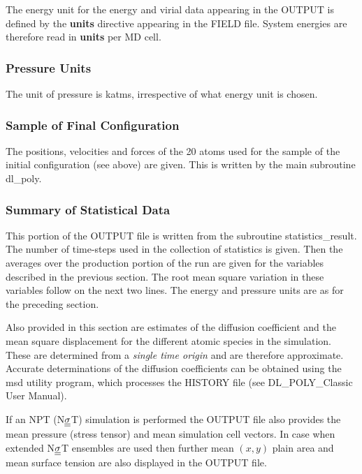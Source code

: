 The energy unit for the energy and virial data appearing in the
OUTPUT is defined by the {\bf units} directive appearing in the
FIELD file.  System energies are therefore read in {\bf units}
per MD cell.

\subsubsection*{Pressure Units}

The unit of pressure is katms, irrespective
of what energy unit is chosen.

\subsubsection{Sample of Final Configuration}

The positions, velocities and forces of the 20 atoms used for the
sample of the initial configuration (see above) are given.  This
is written by the main subroutine {\sc dl\_poly}.

\subsubsection{Summary of Statistical Data}

This portion of the OUTPUT file is written from the subroutine
{\sc statistics\_result}.  The number of time-steps used in the
collection of statistics is given.  Then the averages over the
production portion of the run are given for the variables
described in the previous section.  The root mean square variation
in these variables follow on the next two lines.  The
energy and pressure
units are as for the preceding section.

Also provided in this section are estimates of the diffusion
coefficient and the mean square displacement for the different
atomic species in the simulation.  These are determined from a {\em
single time origin} and are therefore approximate.  Accurate
determinations of the diffusion coefficients can be obtained using
the {\sc msd} utility program, which processes the HISTORY file
(see DL\_POLY\_Classic User Manual).

If an NPT (N$\mbox{$\underline{\underline{\bf \sigma}}$}$T) simulation is performed the OUTPUT
file also provides the mean pressure (stress tensor) and mean
simulation cell vectors.  In case when extended N$\mbox{$\underline{\underline{\bf \sigma}}$}$T
ensembles are used then further mean $(x,y)$ plain area and mean
surface tension are also displayed in the OUTPUT file.

